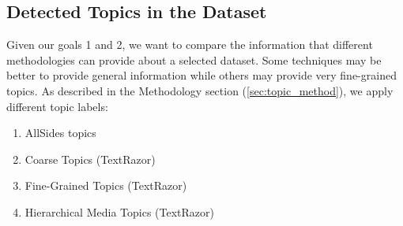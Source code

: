 


\subsection{\statusgreen Detected Topics in the Dataset}
\label{ssec:topic_topic_granularities_alone}





Given our goals 1 and 2, we want to compare the information that different methodologies can provide about a selected dataset. Some techniques may be better to provide general information while others may provide very fine-grained topics.
As described in the Methodology section (\ref{sec:topic_method}),
we apply different topic labels:


\begin{enumerate}
    \item AllSides topics
    \item Coarse Topics (TextRazor)
    \item Fine-Grained Topics (TextRazor)
    \item Hierarchical Media Topics (TextRazor)
\end{enumerate}

